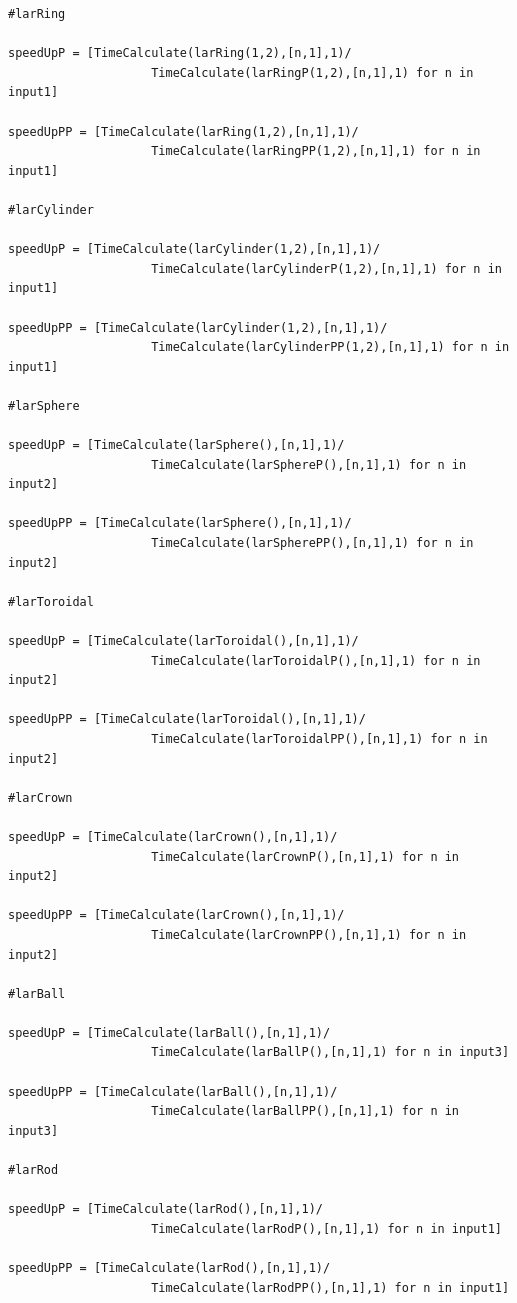 \documentclass{article}
\begin{document}
\begin{Verbatim}
#larRing

speedUpP = [TimeCalculate(larRing(1,2),[n,1],1)/
                    TimeCalculate(larRingP(1,2),[n,1],1) for n in input1]

speedUpPP = [TimeCalculate(larRing(1,2),[n,1],1)/
                    TimeCalculate(larRingPP(1,2),[n,1],1) for n in input1]

#larCylinder

speedUpP = [TimeCalculate(larCylinder(1,2),[n,1],1)/
                    TimeCalculate(larCylinderP(1,2),[n,1],1) for n in input1]

speedUpPP = [TimeCalculate(larCylinder(1,2),[n,1],1)/
                    TimeCalculate(larCylinderPP(1,2),[n,1],1) for n in input1]

#larSphere

speedUpP = [TimeCalculate(larSphere(),[n,1],1)/
                    TimeCalculate(larSphereP(),[n,1],1) for n in input2]

speedUpPP = [TimeCalculate(larSphere(),[n,1],1)/
                    TimeCalculate(larSpherePP(),[n,1],1) for n in input2]

#larToroidal

speedUpP = [TimeCalculate(larToroidal(),[n,1],1)/
                    TimeCalculate(larToroidalP(),[n,1],1) for n in input2]

speedUpPP = [TimeCalculate(larToroidal(),[n,1],1)/
                    TimeCalculate(larToroidalPP(),[n,1],1) for n in input2]

#larCrown

speedUpP = [TimeCalculate(larCrown(),[n,1],1)/
                    TimeCalculate(larCrownP(),[n,1],1) for n in input2]

speedUpPP = [TimeCalculate(larCrown(),[n,1],1)/
                    TimeCalculate(larCrownPP(),[n,1],1) for n in input2]

#larBall

speedUpP = [TimeCalculate(larBall(),[n,1],1)/
                    TimeCalculate(larBallP(),[n,1],1) for n in input3]

speedUpPP = [TimeCalculate(larBall(),[n,1],1)/
                    TimeCalculate(larBallPP(),[n,1],1) for n in input3]

#larRod

speedUpP = [TimeCalculate(larRod(),[n,1],1)/
                    TimeCalculate(larRodP(),[n,1],1) for n in input1]

speedUpPP = [TimeCalculate(larRod(),[n,1],1)/
                    TimeCalculate(larRodPP(),[n,1],1) for n in input1]


\end{Verbatim}
\end{document}
